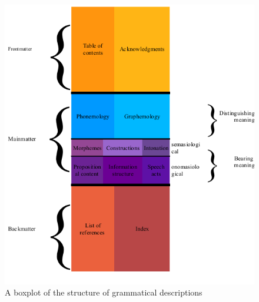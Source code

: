 \documentclass[a4paper,10pt]{article}
\begin{document}
\begin{figure}[p]
 \includegraphics[width=\textwidth]{boxplot.png}
 \caption{A boxplot of the structure of grammatical descriptions}
  \label{fig:boxplot}
\end{figure}
\end{document}
